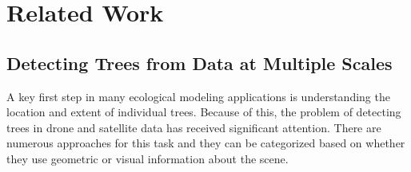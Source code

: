 
\chapter{Related Work} \label{chapRelated}



%
%





\section{Detecting Trees from Data at Multiple Scales}
A key first step in many ecological modeling applications is understanding the location and extent of individual trees. Because of this, the problem of detecting trees in drone and satellite data has received significant attention. There are numerous approaches for this task and they can be categorized based on whether they use geometric or visual information about the scene. 

